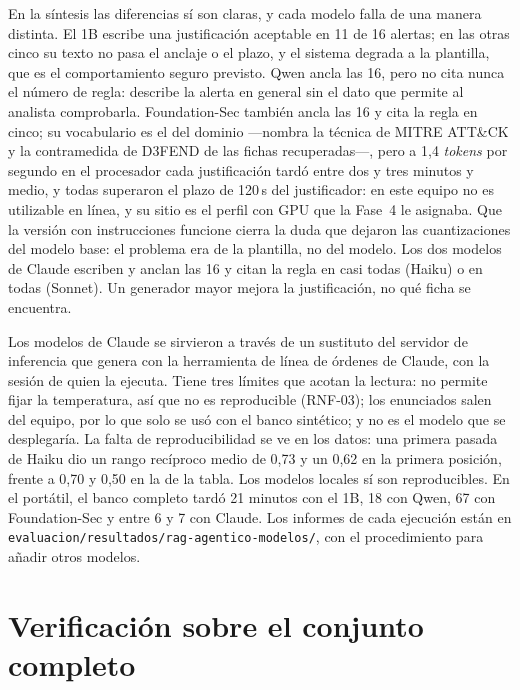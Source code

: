 En la síntesis las diferencias sí son claras, y cada modelo falla de una manera distinta. El 1B
escribe una justificación aceptable en 11 de 16 alertas; en las otras cinco su texto no pasa el
anclaje o el plazo, y el sistema degrada a la plantilla, que es el comportamiento seguro previsto.
Qwen ancla las 16, pero no cita nunca el número de regla: describe la alerta en general sin el dato
que permite al analista comprobarla. Foundation-Sec también ancla las 16 y cita la regla en cinco;
su vocabulario es el del dominio ---nombra la técnica de MITRE ATT\&CK y la contramedida de D3FEND
de las fichas recuperadas---, pero a 1,4 \emph{tokens} por segundo en el procesador cada
justificación tardó entre dos y tres minutos y medio, y todas superaron el plazo de 120\,s del
justificador: en este equipo no es utilizable en línea, y su sitio es el perfil con GPU que la Fase~4
le asignaba. Que la versión con instrucciones funcione cierra la duda que dejaron las
cuantizaciones del modelo base: el problema era de la plantilla, no del modelo. Los dos modelos de Claude escriben y anclan las 16 y citan la
regla en casi todas (Haiku) o en todas (Sonnet). Un generador mayor mejora la justificación, no qué
ficha se encuentra.

Los modelos de Claude se sirvieron a través de un sustituto del servidor de inferencia que genera
con la herramienta de línea de órdenes de Claude, con la sesión de quien la ejecuta. Tiene tres
límites que acotan la lectura: no permite fijar la temperatura, así que no es reproducible
(RNF-03); los enunciados salen del equipo, por lo que solo se usó con el banco sintético; y no es
el modelo que se desplegaría. La falta de reproducibilidad se ve en los datos: una primera pasada
de Haiku dio un rango recíproco medio de 0,73 y un 0,62 en la primera posición, frente a 0,70 y
0,50 en la de la tabla. Los modelos locales sí son reproducibles. En el portátil, el banco completo
tardó 21 minutos con el 1B, 18 con Qwen, 67 con Foundation-Sec y entre 6 y 7 con Claude. Los informes de cada ejecución
están en \texttt{evaluacion/resultados/rag-agentico-modelos/}, con el procedimiento para añadir
otros modelos.

\section{Verificación sobre el conjunto completo}

